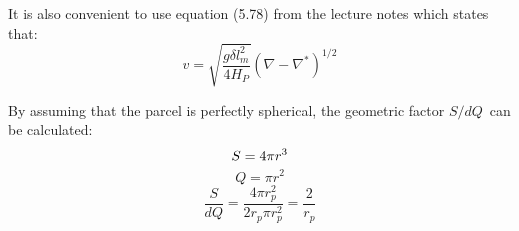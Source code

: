 \documentclass[a4paper,12pt]{article}
\begin{document}
It is also convenient to use equation (5.78) from the lecture notes which states that:
\begin{equation*}
 v = \sqrt{\frac{g\delta l_m^2}{4H_P}}(\nabla - \nabla^*)^{1/2}
\end{equation*}

By assuming that the parcel is perfectly spherical, the geometric factor $S/dQ$ can be calculated:
\begin{equation*}
 S = 4\pi r^3\\
\end{equation*}
\begin{equation*}
 Q = \pi r^2
\end{equation*}
\begin{equation*}
 \frac{S}{dQ} = \frac{4\pi r_p^2}{2r_p\pi r_p^2} = \frac{2}{r_p}
\end{equation*}
\end{document}
